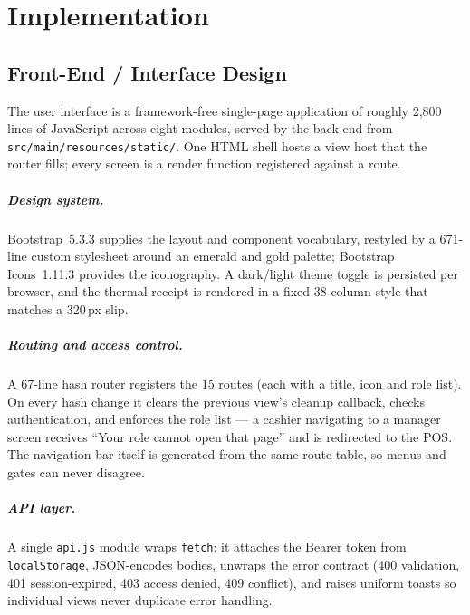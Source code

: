 \documentclass[12pt,a4paper]{report}
\begin{document}
\chapter{Implementation}

\section{Front-End / Interface Design}
The user interface is a framework-free single-page application of roughly 2{,}800 lines
of JavaScript across eight modules, served by the back end from
\texttt{src/main/resources/static/}. One HTML shell hosts a view host that the router
fills; every screen is a render function registered against a route.

\paragraph{Design system.} Bootstrap~5.3.3 supplies the layout and component vocabulary,
restyled by a 671-line custom stylesheet around an emerald and gold palette; Bootstrap
Icons~1.11.3 provides the iconography. A dark/light theme toggle is persisted per
browser, and the thermal receipt is rendered in a fixed 38-column style that matches a
320\,px slip.

\paragraph{Routing and access control.} A 67-line hash router registers the 15 routes
(each with a title, icon and role list). On every hash change it clears the previous
view's cleanup callback, checks authentication, and enforces the role list --- a cashier
navigating to a manager screen receives ``Your role cannot open that page'' and is
redirected to the POS. The navigation bar itself is generated from the same route table,
so menus and gates can never disagree.

\paragraph{API layer.} A single \texttt{api.js} module wraps \texttt{fetch}: it attaches
the Bearer token from \texttt{localStorage}, JSON-encodes bodies, unwraps the error
contract (400 validation, 401 session-expired, 403 access denied, 409 conflict), and
raises uniform toasts so individual views never duplicate error handling.
\end{document}
